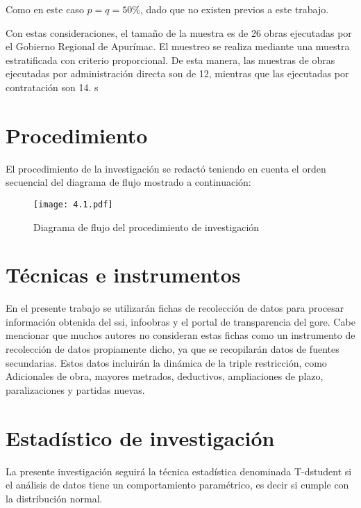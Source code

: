 Como en este caso  $ p = q = 50\%  $, dado que no existen previos a este trabajo.

Con estas consideraciones, el tamaño de la muestra es de 26 obras ejecutadas por el Gobierno Regional de Apurímac. El muestreo se realiza mediante una muestra estratificada con criterio proporcional. De esta manera, las muestras de obras ejecutadas por administración directa son de 12, mientras que las ejecutadas por contratación son 14. \citeauthor{HernandezSampieri2014} s

\section{Procedimiento}

El procedimiento de la investigación se redactó teniendo en cuenta el orden secuencial del diagrama de flujo mostrado a continuación: 

\begin{figure}[h]
\captionsetup{width=0.95\textwidth}
\centering
\texttt{[image: 4.1.pdf]}
\caption[Procedimiento investigativo]{Diagrama de flujo del procedimiento de investigación}
\label{fig:proced}
\end{figure}

\section{Técnicas e instrumentos}

En el presente trabajo se utilizarán fichas de recolección de datos para procesar información obtenida del \acrlong{ssi}, infoobras y el portal de transparencia del \acrlong{gore}. Cabe mencionar que muchos autores no consideran estas fichas como un instrumento de recolección de datos propiamente dicho, ya que se recopilarán datos de fuentes secundarias. Estos datos incluirán la dinámica de la triple restricción, como Adicionales de obra, mayores metrados, deductivos, ampliaciones de plazo, paralizaciones y partidas nuevas.

\section{Estadístico de investigación}

La presente investigación seguirá la técnica estadística denominada T-dstudent si el análisis de datos tiene un comportamiento paramétrico, es decir si cumple con la distribución normal.